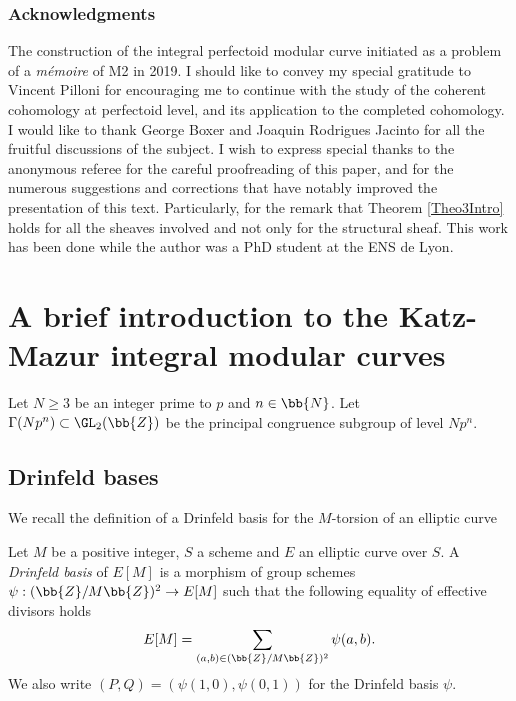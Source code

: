 \subsubsection*{Acknowledgments} The construction of the integral perfectoid modular curve initiated as a problem of a \textit{mémoire} of M2 in 2019. I should like to convey my special gratitude to Vincent Pilloni for encouraging me to continue with the study of the coherent cohomology at perfectoid level, and its application to the completed cohomology. I would like to thank George Boxer and Joaquin Rodrigues Jacinto for all the fruitful discussions of the subject. I wish to express special thanks to the anonymous referee for the careful proofreading of this paper, and for the numerous suggestions and corrections that have notably improved the presentation of this text. Particularly, for the remark that Theorem \ref{Theo3Intro} holds for all the sheaves involved and not only for the structural sheaf. This work has been done while the author was a PhD student at the ENS de Lyon.

\section{A brief introduction to the Katz-Mazur integral modular curves}

\label{RecallsModularCurves}

Let $N\geq 3$ be an integer prime to $p$ and $n\in \bb{N}$. Let $\Gamma(Np^n)\subset \GL_2(\bb{Z})$ be the principal congruence subgroup of level $Np^n$.
\subsection*{Drinfeld bases}

We recall the definition of a Drinfeld basis for the $M$-torsion of an elliptic curve

\begin{definition}
Let $M$ be a positive integer, $S$ a scheme and $E$ an elliptic curve over $S$. A \textit{Drinfeld basis} of $E[M]$ is a morphism of group schemes $ \psi:(\bb{Z}/M\bb{Z})^2\to E[M] $ such that the following equality of effective divisors holds
\begin{equation}
\label{eqDrinfeldbasis}
E[M]=\sum_{(a,b)\in (\bb{Z}/M\bb{Z})^2} \psi(a,b).
\end{equation}
We also write $(P,Q)=(\psi(1,0), \psi(0,1))$ for the Drinfeld basis $\psi$.
\end{definition}

